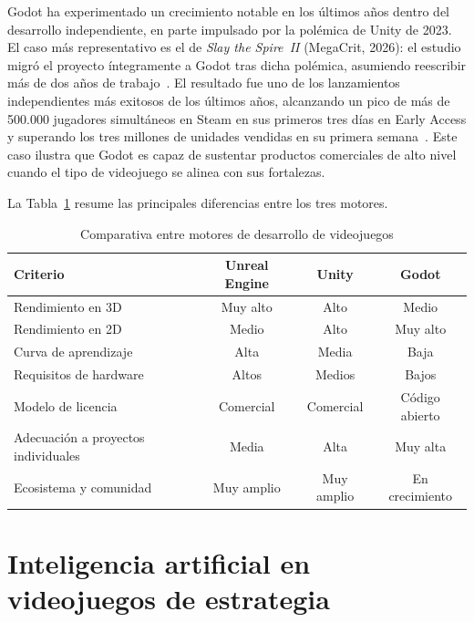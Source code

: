 \clearpage

Godot ha experimentado un crecimiento notable en los últimos años dentro del desarrollo independiente, en parte impulsado por la polémica de Unity de 2023. El caso más representativo es el de \textit{Slay the Spire~II} (MegaCrit, 2026): el estudio migró el proyecto íntegramente a Godot tras dicha polémica, asumiendo reescribir más de dos años de trabajo~\cite{slayspire2_godot}. El resultado fue uno de los lanzamientos independientes más exitosos de los últimos años, alcanzando un pico de más de 500.000 jugadores simultáneos en Steam en sus primeros tres días en Early Access y superando los tres millones de unidades vendidas en su primera semana~\cite{slayspire2_launch}. Este caso ilustra que Godot es capaz de sustentar productos comerciales de alto nivel cuando el tipo de videojuego se alinea con sus fortalezas.

La Tabla~\ref{tab:comparativa_motores} resume las principales diferencias entre los tres motores.

\begin{table}[H]
	\centering
	\begin{tabular}{|l|c|c|c|}
		\hline
		\textbf{Criterio} & \textbf{Unreal Engine} & \textbf{Unity} & \textbf{Godot} \\
		\hline
		Rendimiento en 3D        & Muy alto   & Alto      & Medio          \\
		\hline
		Rendimiento en 2D        & Medio      & Alto      & Muy alto       \\
		\hline
		Curva de aprendizaje     & Alta       & Media     & Baja           \\
		\hline
		Requisitos de hardware   & Altos      & Medios    & Bajos          \\
		\hline
		Modelo de licencia       & Comercial  & Comercial & Código abierto \\
		\hline
		Adecuación a proyectos individuales & Media & Alta & Muy alta      \\
		\hline
		Ecosistema y comunidad   & Muy amplio & Muy amplio & En crecimiento\\
		\hline
	\end{tabular}
	\caption{Comparativa entre motores de desarrollo de videojuegos}
	\label{tab:comparativa_motores}
\end{table}

\section{Inteligencia artificial en videojuegos de estrategia}

